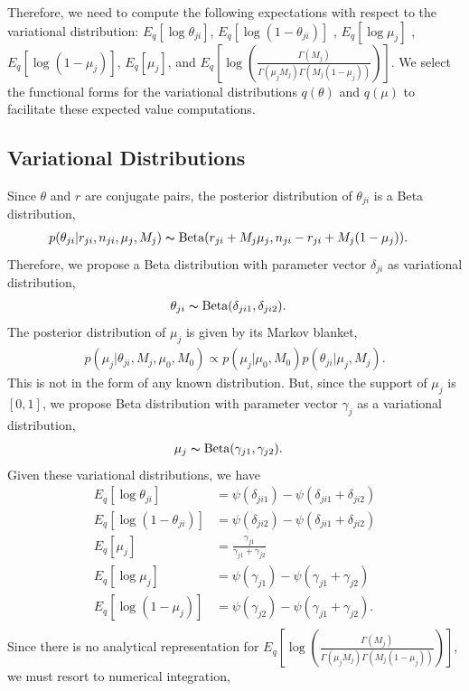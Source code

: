 \documentclass[11pt,reqno]{amsart}
\begin{document}
Therefore, we need to compute the following expectations with respect to the variational distribution:
%
$ E_q \left[ \log \theta_{ji} \right] $, $ E_q\left[ \log \left( 1 - \theta_{ji}\right) \right] $ , $ E_q  \left[ \log \mu_j \right] $ , $ E_q  \left[ \log (1 - \mu_j)\right] $, $ E_q \left[ \mu_j \right] $, and $ E_q\left[ \log \left( \frac{ \Gamma(M_j) } { \Gamma(\mu_j M_j) \Gamma(M_j (1-\mu_j)) }\right)\right] $.
We select the functional forms for the variational distributions $q(\theta)$ and $q(\mu)$ to facilitate these expected value computations.

\subsection{Variational Distributions}
Since $\theta$ and $r$ are conjugate pairs, the posterior distribution of $\theta_{ji}$ is a Beta distribution,
\begin{align}
&p(\theta_{ji}|r_{ji},n_{ji},\mu_j,M_j)
\thicksim \text{Beta}(r_{ji}+M_j \mu_j, n_{ji}-r_{ji}+M_j(1-\mu_j)).
\end{align}
Therefore, we propose a Beta distribution with parameter vector $\delta_{ji}$ as variational distribution,
\begin{align}
\theta_{ji} &\thicksim \text{Beta}(\delta_{ji1}, \delta_{ji2}) \nonumber.
\end{align}
%
The posterior distribution of $\mu_j$ is given by its Markov blanket,
\begin{align}
p(\mu_j|\theta_{ji},M_j,\mu_0,M_0)\propto p(\mu_j|\mu_0,M_0)p(\theta_{ji}|\mu_j,M_j).
\end{align}
This is not in the form of any known distribution.
But, since the support of $\mu_j$ is $[0,1]$, we propose Beta distribution with parameter vector $\gamma_{j}$ as a variational distribution,
\begin{align}
\mu_j &\thicksim \text{Beta}(\gamma_{j1}, \gamma_{j2}) \nonumber.
\end{align}
Given these variational distributions, we have
\begin{align}
E_q \left[ \log \theta_{ji} \right] &= \psi(\delta_{ji1}) - \psi(\delta_{ji1}+\delta_{ji2}) \nonumber \\
E_q \left[ \log \left( 1 - \theta_{ji}\right) \right]&= \psi(\delta_{ji2}) - \psi(\delta_{ji1}+\delta_{ji2}) \nonumber \\
E_q \left[ \mu_j \right] &= \frac{\gamma_{j1}}{\gamma_{j1} + \gamma_{j2}} \nonumber \\
E_q  \left[ \log \mu_j \right] &= \psi(\gamma_{j1}) - \psi(\gamma_{j1}+\gamma_{j2}) \nonumber \\
E_q  \left[ \log (1 - \mu_j)\right] &= \psi(\gamma_{j2}) - \psi(\gamma_{j1}+\gamma_{j2})\nonumber. \\
\end{align}
%
Since there is no analytical representation for $ E_q\left[ \log \left( \frac{ \Gamma(M_j) } { \Gamma(\mu_j M_j) \Gamma(M_j (1-\mu_j)) }\right)\right] $, we must resort to numerical integration,
\end{document}
